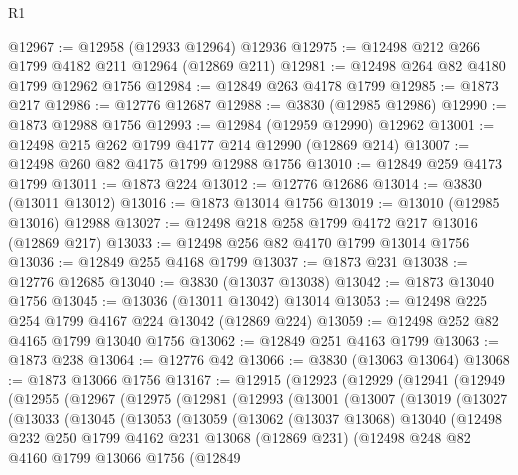 \begin{lexlean}{R1}
\begin{coremodule}
@12967 := @12958 (@12933 @12964) @12936
@12975 := @12498 @212 @266 @1799 @4182 @211 @12964 (@12869 @211)
@12981 := @12498 @264 @82 @4180 @1799 @12962 @1756
@12984 := @12849 @263 @4178 @1799
@12985 := @1873 @217
@12986 := @12776 @12687
@12988 := @3830 (@12985 @12986)
@12990 := @1873 @12988 @1756
@12993 := @12984 (@12959 @12990) @12962
@13001 := @12498 @215 @262 @1799 @4177 @214 @12990 (@12869 @214)
@13007 := @12498 @260 @82 @4175 @1799 @12988 @1756
@13010 := @12849 @259 @4173 @1799
@13011 := @1873 @224
@13012 := @12776 @12686
@13014 := @3830 (@13011 @13012)
@13016 := @1873 @13014 @1756
@13019 := @13010 (@12985 @13016) @12988
@13027 := @12498 @218 @258 @1799 @4172 @217 @13016 (@12869 @217)
@13033 := @12498 @256 @82 @4170 @1799 @13014 @1756
@13036 := @12849 @255 @4168 @1799
@13037 := @1873 @231
@13038 := @12776 @12685
@13040 := @3830 (@13037 @13038)
@13042 := @1873 @13040 @1756
@13045 := @13036 (@13011 @13042) @13014
@13053 := @12498 @225 @254 @1799 @4167 @224 @13042 (@12869 @224)
@13059 := @12498 @252 @82 @4165 @1799 @13040 @1756
@13062 := @12849 @251 @4163 @1799
@13063 := @1873 @238
@13064 := @12776 @42
@13066 := @3830 (@13063 @13064)
@13068 := @1873 @13066 @1756
@13167 := @12915
    (@12923
      (@12929
        (@12941
          (@12949
            (@12955
              (@12967
                (@12975
                  (@12981
                    (@12993
                      (@13001
                        (@13007
                          (@13019
                            (@13027
                              (@13033
                                (@13045
                                  (@13053
                                    (@13059
                                      (@13062
                                        (@13037 @13068)
                                        @13040
                                        (@12498
                                          @232
                                          @250
                                          @1799
                                          @4162
                                          @231
                                          @13068
                                          (@12869 @231)
                                          (@12498
                                            @248
                                            @82
                                            @4160
                                            @1799
                                            @13066
                                            @1756
                                            (@12849

\end{coremodule}
\end{lexlean}
